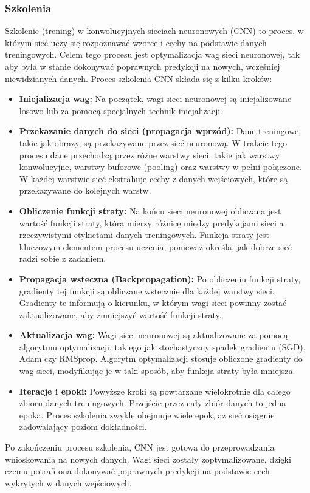 \subsubsection{Szkolenia}
Szkolenie (trening) w konwolucyjnych sieciach neuronowych (CNN) to proces, w którym sieć uczy się rozpoznawać wzorce i cechy na podstawie danych treningowych. Celem tego procesu jest optymalizacja wag sieci neuronowej, tak aby była w stanie dokonywać poprawnych predykcji na nowych, wcześniej niewidzianych danych. Proces szkolenia CNN składa się z kilku kroków:
\begin{itemize}
    \item \textbf{Inicjalizacja wag:} Na początek, wagi sieci neuronowej są inicjalizowane losowo lub za pomocą specjalnych technik inicjalizacji.
    \item \textbf{Przekazanie danych do sieci (propagacja wprzód):} Dane treningowe, takie jak obrazy, są przekazywane przez sieć neuronową. W trakcie tego procesu dane przechodzą przez różne warstwy sieci, takie jak warstwy konwolucyjne, warstwy buforowe (pooling) oraz warstwy w pełni połączone. W każdej warstwie sieć ekstrahuje cechy z danych wejściowych, które są przekazywane do kolejnych warstw.
    \item \textbf{Obliczenie funkcji straty:} Na końcu sieci neuronowej obliczana jest wartość funkcji straty, która mierzy różnicę między predykcjami sieci a rzeczywistymi etykietami danych treningowych. Funkcja straty jest kluczowym elementem procesu uczenia, ponieważ określa, jak dobrze sieć radzi sobie z zadaniem.
    \item \textbf{Propagacja wsteczna (Backpropagation): }Po obliczeniu funkcji straty, gradienty tej funkcji są obliczane wstecznie dla każdej warstwy sieci. Gradienty te informują o kierunku, w którym wagi sieci powinny zostać zaktualizowane, aby zmniejszyć wartość funkcji straty.
    \item \textbf{Aktualizacja wag:} Wagi sieci neuronowej są aktualizowane za pomocą algorytmu optymalizacji, takiego jak stochastyczny spadek gradientu (SGD), Adam czy RMSprop. Algorytm optymalizacji stosuje obliczone gradienty do wag sieci, modyfikując je w taki sposób, aby funkcja straty była mniejsza.
    \item \textbf{Iteracje i epoki: }Powyższe kroki są powtarzane wielokrotnie dla całego zbioru danych treningowych. Przejście przez cały zbiór danych to jedna epoka. Proces szkolenia zwykle obejmuje wiele epok, aż sieć osiągnie zadowalający poziom dokładności.
\end{itemize}
Po zakończeniu procesu szkolenia, CNN jest gotowa do przeprowadzania wnioskowania na nowych danych. Wagi sieci zostały zoptymalizowane, dzięki czemu potrafi ona dokonywać poprawnych predykcji na podstawie cech wykrytych w danych wejściowych.
